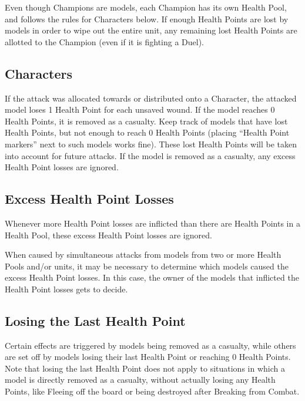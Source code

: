 Even though Champions are \rnf{} models, each Champion has its own Health Pool, and follows the rules for Characters below. If enough Health Points are lost by \rnf{} models in order to wipe out the entire unit, any remaining lost Health Points are allotted to the Champion (even if it is fighting a Duel).

\subsection{Characters}

If the attack was allocated towards or distributed onto a Character, the attacked model loses 1 Health Point for each unsaved wound. If the model reaches 0 Health Points, it is removed as a casualty. Keep track of models that have lost Health Points, but not enough to reach 0 Health Points (placing \enquote{Health Point markers} next to such models works fine). These lost Health Points will be taken into account for future attacks. If the model is removed as a casualty, any excess Health Point losses are ignored.

\subsection{Excess Health Point Losses}

Whenever more Health Point losses are inflicted than there are Health Points in a Health Pool, these excess Health Point losses are ignored.

When caused by simultaneous attacks from models from two or more Health Pools and/or units, it may be necessary to determine which models caused the excess Health Point losses. In this case, the owner of the models that inflicted the Health Point losses gets to decide.

\subsection{Losing the Last Health Point}

Certain effects are triggered by models being removed as a casualty, while others are set off by models losing their last Health Point or reaching 0 Health Points. Note that losing the last Health Point does not apply to situations in which a model is directly removed as a casualty, without actually losing any Health Points, like Fleeing off the board or being destroyed after Breaking from Combat.

